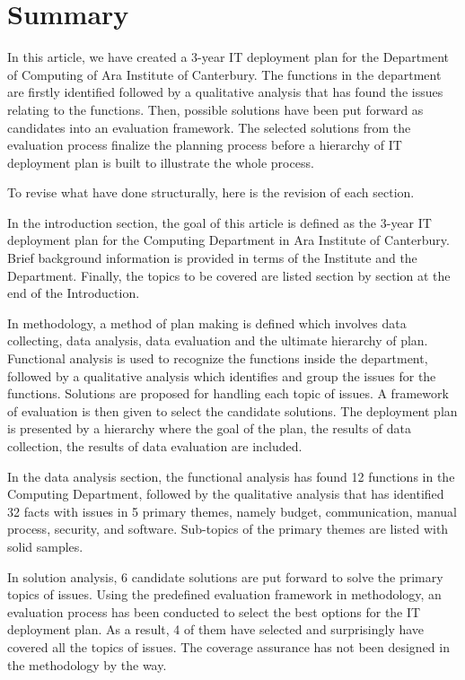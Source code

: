 
\section{Summary}

In this article, we have created a 3-year IT deployment plan for the Department of Computing of Ara Institute of Canterbury. The functions in the department are firstly identified followed by a qualitative analysis that has found the issues relating to the functions. Then, possible solutions have been put forward as candidates into an evaluation framework. The selected solutions from the evaluation process finalize the planning process before a hierarchy of IT deployment plan is built to illustrate the whole process.

To revise what have done structurally, here is the revision of each section.

In the introduction section, the goal of this article is defined as the 3-year IT deployment plan for the Computing Department in Ara Institute of Canterbury. Brief background information is provided in terms of the Institute and the Department. Finally, the topics to be covered are listed section by section at the end of the Introduction.

In methodology, a method of plan making is defined which involves data collecting, data analysis, data evaluation and the ultimate hierarchy of plan. Functional analysis is used to recognize the functions inside the department, followed by a qualitative analysis which identifies and group the issues for the functions. Solutions are proposed for handling each topic of issues. A framework of evaluation is then given to select the candidate solutions. The deployment plan is presented by a hierarchy where the goal of the plan, the results of data collection,  the results of data evaluation are included.

In the data analysis section, the functional analysis has found 12 functions in the Computing Department, followed by the qualitative analysis that has identified 32 facts with issues in 5 primary themes, namely budget, communication, manual process, security, and software. Sub-topics of the primary themes are listed with solid samples.

In solution analysis, 6 candidate solutions are put forward to solve the primary topics of issues. Using the predefined evaluation framework in methodology, an evaluation process has been conducted to select the best options for the IT deployment plan. As a result, 4 of them have selected and surprisingly have covered all the topics of issues. The coverage assurance has not been designed in the methodology by the way.

